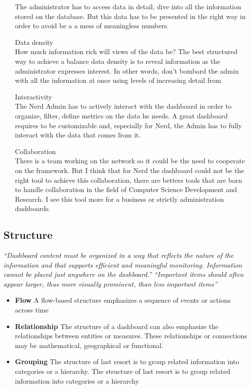 \documentclass[a4paper,12pt]{report}
\begin{document}
\begin{itemize}
The administrator has to access data in detail, dive into all the information stored on the database. But this data has to be presented in the right way in order to avoid  be a a mess of meaningless numbers.
\item[Data density] \hfill \\
 How much information rich will views of the data be? The best structured way to achieve a balance data density is to reveal information as the administrator expresses interest. In other words, don't bombard the admin with all the information at once using levels of increasing detail from 
\item[Interactivity] \hfill \\ 
The Nerd Admin has to actively interact with the dashboard in order to organize, filter, define metrics on the data he needs. A great dashboard requires to be customizable and, especially for Nerd, the Admin has to fully interact with the data that comes from it.
\item[Collaboration] \hfill \\
There is a team working on the network so it could be the need to cooperate on the framework. But I think that for Nerd the dashboard could not be the right tool to achieve this collaboration, there are betters tools that are born to handle collaboration in the field of Computer Science Development and Research. 
I see this tool more for a business or strictly administration dashboards.
\end{itemize}
\subsection{Structure}
\emph{``Dashboard content must be organized in a way that reflects the nature of the information and that supports efficient and meaningful monitoring. Information cannot be placed just anywhere on the dashboard.''}\newline
\emph{``Important items should often appear larger, thus more visually prominent, than less important items''}

\begin{itemize}
    \item \textbf{Flow}\newline
    A flow-based structure emphasizes a sequence of events or actions across time
    \item \textbf{Relationship}\newline
    The structure of a dashboard can also emphasize the relationships between entities or measures. These relationships or connections may be mathematical, geographical or functional.
    \item \textbf{Grouping}\newline
    The structure of last resort is to group related information into categories or a hierarchy. The structure of last resort is to group related information into categories or a hierarchy
\end{itemize}
\end{document}
